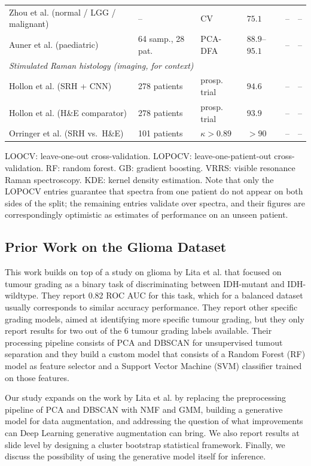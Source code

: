 \begin{table}[htp]
\begin{tabular}{@{}p{3.3cm}p{3.1cm}p{2.2cm}>{\centering\arraybackslash}p{1.3cm}>{\centering\arraybackslash}p{1.2cm}>{\centering\arraybackslash}p{1.2cm}@{}}
Zhou et al. (normal / LGG / malignant) & -- & CV & $75.1$ & -- & --\\
Auner et al. (paediatric) & 64 samp., 28 pat. & PCA-DFA & $88.9$--$95.1$ & -- & --\\
\midrule
\multicolumn{6}{l}{\emph{Stimulated Raman histology (imaging, for context)}}\\
\midrule
Hollon et al. (SRH + CNN) & 278 patients & prosp. trial & $94.6$ & -- & --\\
Hollon et al. (H\&E comparator) & 278 patients & prosp. trial & $93.9$ & -- & --\\
Orringer et al. (SRH vs.\ H\&E) & 101 patients & $\kappa > 0.89$ & $>90$ & -- & --\\
\bottomrule
\end{tabular}
\small{LOOCV: leave-one-out cross-validation. LOPOCV: leave-one-patient-out cross-validation.
RF: random forest. GB: gradient boosting. VRRS: visible resonance Raman spectroscopy.
KDE: kernel density estimation. Note that only the LOPOCV entries guarantee that spectra from
one patient do not appear on both sides of the split; the remaining entries validate over
spectra, and their figures are correspondingly optimistic as estimates of performance on an
unseen patient.}
\end{table}

\subsection*{Prior Work on the Glioma Dataset}

This work builds on top of a study on glioma by Lita et al. \cite{apollonov2024raman} that focused on tumour grading as a binary task of discriminating between IDH-mutant and IDH-wildtype. They report 0.82 ROC AUC for this task, which for a balanced dataset usually corresponds to similar accuracy performance. They report other specific grading models, aimed at identifying more specific tumour grading, but they only report results for two out of the 6 tumour grading labels available. Their processing pipeline consists of PCA and DBSCAN for unsupervised tumout separation and they build a custom model that consists of a Random Forest (RF) model as feature selector and a Support Vector Machine (SVM) classifier trained on those features. 

Our study expands on the work by Lita et al. \cite{apollonov2024raman} by replacing the preprocessing pipeline of PCA and DBSCAN with NMF and GMM, building a generative model for data augmentation, and addressing the question of what improvements can Deep Learning generative augmentation can bring. We also report results at slide level by designing a cluster bootstrap statistical framework. Finally, we discuss the possibility of using the generative model itself for inference.


